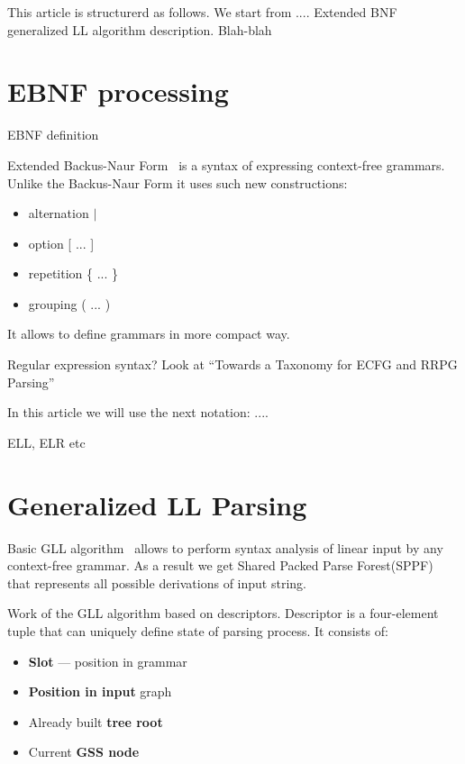 \documentclass[runningheads,a4paper]{llncs}
\begin{document}
This article is structurerd as follows.
We start from .... Extended BNF
generalized LL algorithm description.
Blah-blah





\section{EBNF processing}

EBNF definition

Extended Backus-Naur Form~\cite{iso} is a syntax of expressing context-free grammars. Unlike the Backus-Naur Form it 
uses such new constructions:
\begin{itemize}
    \item alternation $\mid$
    \item option [ ... ]
    \item repetition \{ ... \}
    \item grouping ( ... )
\end{itemize}

It allows to define grammars in more compact way.

Regular expression syntax? Look at ``Towards a Taxonomy for ECFG and RRPG Parsing''

In this article we will use the next notation: ....

ELL, ELR etc


\section{Generalized LL Parsing}%

Basic GLL algorithm~\cite{scott2010gll} allows to perform syntax analysis of linear input by any context-free 
grammar. As a result we get Shared Packed Parse Forest(SPPF)~\cite{SPPF} that represents all possible derivations of input string.

Work of the GLL algorithm based on descriptors. Descriptor is a four-element tuple that can uniquely define state 
of parsing process. It consists of:
\begin{itemize}
    \item \textbf{Slot} --- position in grammar
    \item \textbf{Position in input} graph
    \item Already built \textbf{tree root}
    \item Current \textbf{GSS node}
\end{itemize}
\end{document}
